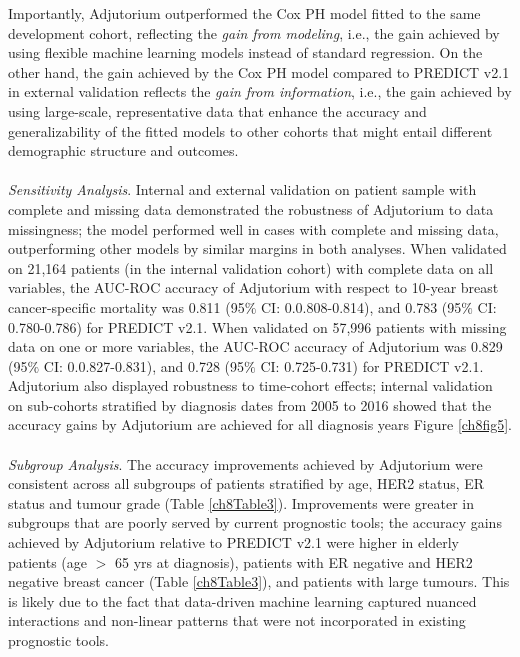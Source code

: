 \documentclass [PhD] {uclathes}
\begin{document}
Importantly, Adjutorium outperformed the Cox PH model fitted to the same development cohort, reflecting the {\it gain from modeling}, i.e., the gain achieved by using flexible machine learning models instead of standard regression. On the other hand, the gain achieved by the Cox PH model compared to PREDICT v2.1 in external validation reflects the {\it gain from information}, i.e., the gain achieved by using large-scale, representative data that enhance the accuracy and generalizability of the fitted models to other cohorts that might entail different demographic structure and outcomes. \\
\\
\textit{Sensitivity Analysis}. Internal and external validation on patient sample with complete and missing data demonstrated the robustness of Adjutorium to data missingness; the model performed well in cases with complete and missing data, outperforming other models by similar margins in both analyses. When validated on 21,164 patients (in the internal validation cohort) with complete data on all variables, the AUC-ROC accuracy of Adjutorium with respect to 10-year breast cancer-specific mortality was 0.811 (95$\%$ CI: 0.0.808-0.814), and 0.783 (95$\%$ CI: 0.780-0.786) for PREDICT v2.1. When validated on 57,996 patients with missing data on one or more variables, the AUC-ROC accuracy of Adjutorium was 0.829 (95$\%$ CI: 0.0.827-0.831), and 0.728 (95$\%$ CI: 0.725-0.731) for PREDICT v2.1. Adjutorium also displayed robustness to time-cohort effects; internal validation on sub-cohorts stratified by diagnosis dates from 2005 to 2016 showed that the accuracy gains by Adjutorium are achieved for all diagnosis years Figure \ref{ch8fig5}.\\
\\
\textit{Subgroup Analysis}. The accuracy improvements achieved by Adjutorium were consistent across all subgroups of patients stratified by age, HER2 status, ER status and tumour grade (Table \ref{ch8Table3}). Improvements were greater in subgroups that are poorly served by current prognostic tools; the accuracy gains achieved by Adjutorium relative to PREDICT v2.1 were higher in elderly patients (age $>$ 65 yrs at diagnosis), patients with ER negative and HER2 negative breast cancer (Table \ref{ch8Table3}), and patients with large tumours. This is likely due to the fact that data-driven machine learning captured nuanced interactions and non-linear patterns that were not incorporated in existing prognostic tools. 
\end{document}
